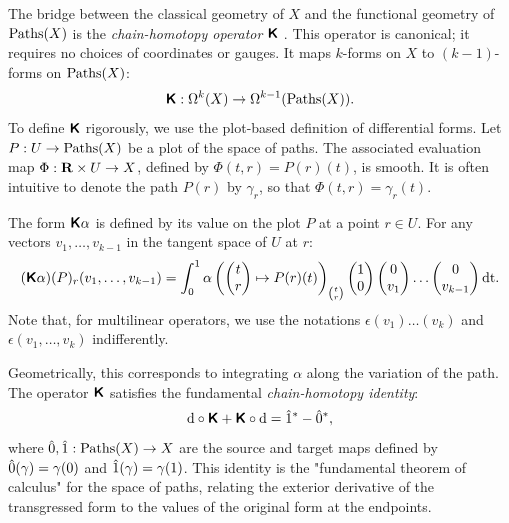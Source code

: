 \documentclass[10pt,reqno,letterpaper,twoside]{amsbook}
\begin{document}
  \begin{article}
    \label{subsec:The Chain-Homotopy Operator}
    The bridge between the classical geometry of $X$ and the functional geometry of $\operatorname{Paths}(X)$ is the \emph{chain-homotopy operator} $\boldsymbol{\mathsf{K}}$ \cite{PIZ13}.
    This operator is canonical;
    it requires no choices of coordinates or gauges.
    It maps $k$-forms on $X$ to $(k-1)$-forms on $\operatorname{Paths}(X)$:
    \[
      \boldsymbol{\mathsf{K}} : \Omega^k(X) \to \Omega^{k-1}(\operatorname{Paths}(X)).
      \]
    To define $\boldsymbol{\mathsf{K}}$ rigorously,
    we use the plot-based definition of differential forms.
    Let $P: U \to \operatorname{Paths}(X)$ be a plot of the space of paths.
    The associated evaluation map $\Phi: {\mathbf{R}} \times U \to X$,
    defined by $\Phi(t,r) = P(r)(t)$,
    is smooth.
    It is often intuitive to denote the path $P(r)$ by $\gamma_r$,
    so that $\Phi(t,r) = \gamma_r(t)$.
    
    The form $\boldsymbol{\mathsf{K}}\alpha$ is defined by its value on the plot $P$ at a point $r \in U$.
    For any vectors $v_1, \dots, v_{k-1}$ in the tangent space of $U$ at $r$:
    \[
      (\boldsymbol{\mathsf{K}}\alpha)(P)_r(v_1, \dots, v_{k-1}) = \int_0^1 \alpha\left(\begin{pmatrix}t \\ r\end{pmatrix} \mapsto P(r)(t) \right)_{t \choose r}\begin{pmatrix}1 \\ 0\end{pmatrix} \begin{pmatrix}0 \\ v_1\end{pmatrix} \dots \begin{pmatrix}0 \\ v_{k-1}\end{pmatrix} \mathrm{dt}.
      \]
    Note that,
    for multilinear operators,
    we use the notations $\epsilon(v_1)\dots(v_k)$ and $\epsilon(v_1,\dots,v_k)$ indifferently.
    
    Geometrically,
    this corresponds to integrating $\alpha$ along the variation of the path.
    The operator $\boldsymbol{\mathsf{K}}$ satisfies the fundamental \emph{chain-homotopy identity}:
    \[
      \mathrm{d} \circ \boldsymbol{\mathsf{K}} + \boldsymbol{\mathsf{K}} \circ \mathrm{d} = \hat 1^* - \hat 0^*,
      \]
    where $\hat 0, \hat 1: \operatorname{Paths}(X) \to X$ are the source and target maps defined by $\hat 0(\gamma) = \gamma(0)$ and $\hat 1(\gamma) = \gamma(1)$.
    This identity is the "fundamental theorem of calculus" for the space of paths,
    relating the exterior derivative of the transgressed form to the values of the original form at the endpoints.
    

\end{article}
\end{document}
